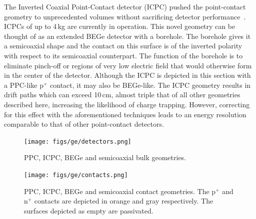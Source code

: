 The Inverted Coaxial Point-Contact detector (ICPC) pushed the point-contact geometry to unprecedented volumes without sacrificing detector performance~\cite{icpc,icpc_psd}. ICPCs of up to 4\,kg are currently in operation. This novel geometry can be thought of as an extended BEGe detector with a borehole. The borehole gives it a semicoaxial shape and the contact on this surface is of the inverted polarity with respect to its semicoaxial counterpart. The function of the borehole is to eliminate pinch-off or regions of very low electric field that would otherwise form in the center of the detector. Although the ICPC is depicted in this section with a PPC-like p$^+$ contact, it may also be BEGe-like. The ICPC geometry results in drift paths which can exceed 10\,cm, almost triple that of all other geometries described here, increasing the likelihood of charge trapping. However, correcting for this effect with the aforementioned techniques leads to an energy resolution comparable to that of other point-contact detectors.  
\begin{figure}[H]
	\centering
	\texttt{[image: figs/ge/detectors.png]}
	\caption{PPC, ICPC, BEGe and semicoaxial bulk geometries.}
	\label{fig:det_geo}
\end{figure}
\begin{figure}[H]
	\centering
	\texttt{[image: figs/ge/contacts.png]}
	\caption{PPC, ICPC, BEGe and semicoaxial contact geometries. The p$^+$ and n$^+$ contacts are depicted in orange and gray respectively. The surfaces depicted as empty are passivated.}
	\label{fig:det_contacts}
\end{figure}
